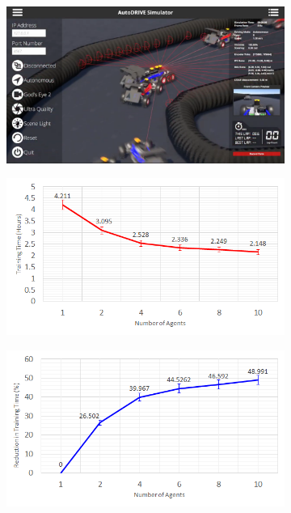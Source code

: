 \documentclass[letterpaper, 10 pt, conference]{ieeeconf}  %
\begin{document}
	
	\begin{figure}[t]
		\centering
		\begin{subfigure}[b]{0.32\linewidth}
			\centering
			\includegraphics[width=\linewidth]{Fig11a.png}
			\caption{}
			\label{fig11a}
		\end{subfigure}
		\hfill
		\begin{subfigure}[b]{0.32\linewidth}
			\centering
			\includegraphics[width=\linewidth]{Fig11b.png}
			\caption{}
			\label{fig11b}
		\end{subfigure}
		\hfill
		\begin{subfigure}[b]{0.32\linewidth}
			\centering
			\includegraphics[width=\linewidth]{Fig11c.png}

\end{subfigure}
\end{figure}
\end{document}
